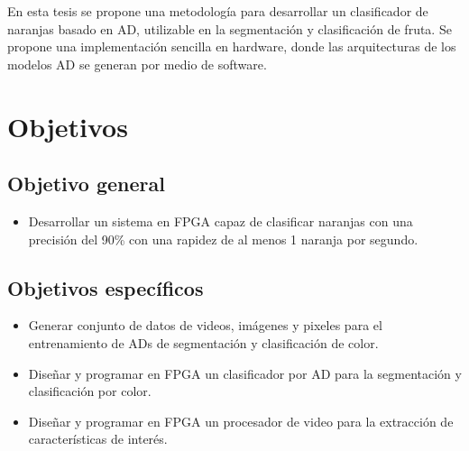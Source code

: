 \documentclass[twoside,spanish,ESP,MSc]{plantillaLabUPV}
\theoremstyle{definition}
\begin{document}
En esta tesis se propone una metodología para desarrollar un clasificador de naranjas basado en AD, utilizable en la segmentación y clasificación de fruta. Se propone una implementación sencilla en hardware, donde las arquitecturas de los modelos AD se generan por medio de software.

\section{Objetivos}
\subsection*{Objetivo general}
\begin{itemize}[noitemsep]
 \item Desarrollar un sistema en FPGA capaz de clasificar naranjas con una precisión del 90\% con una rapidez de al menos 1 naranja por segundo.
\end{itemize}

\subsection*{Objetivos específicos}
\begin{itemize}[noitemsep]
 \item Generar conjunto de datos de videos, imágenes y pixeles para el entrenamiento de ADs de segmentación y clasificación de color.
 \item Diseñar y programar en FPGA un clasificador por AD para la segmentación y clasificación por color.
 \item Diseñar y programar en FPGA un procesador de video para la extracción de características de interés.

\end{itemize}
\end{document}
